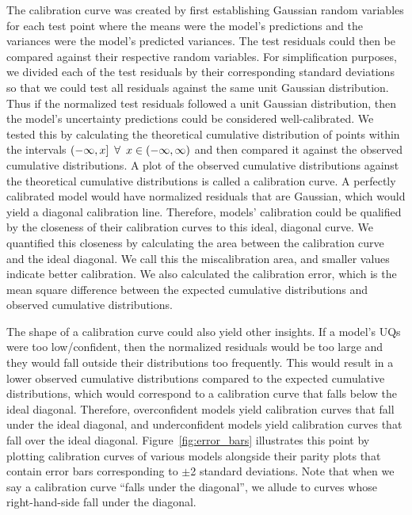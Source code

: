 \documentclass[]{achemso}
\begin{document}
The calibration curve was created by first establishing Gaussian random variables for each test point where the means were the model's predictions and the variances were the model's predicted variances.
The test residuals could then be compared against their respective random variables.
For simplification purposes, we divided each of the test residuals by their corresponding standard deviations so that we could test all residuals against the same unit Gaussian distribution.
Thus if the normalized test residuals followed a unit Gaussian distribution, then the model's uncertainty predictions could be considered well-calibrated.
We tested this by calculating the theoretical cumulative distribution of points within the intervals $(-\infty, x] \mkern9mu \forall \mkern9mu x \in (-\infty, \infty)$ and then compared it against the observed cumulative distributions.  %
A plot of the observed cumulative distributions against the theoretical cumulative distributions is called a calibration curve.
A perfectly calibrated model would have normalized residuals that are Gaussian, which would yield a diagonal calibration line.
Therefore, models' calibration could be qualified by the closeness of their calibration curves to this ideal, diagonal curve.
We quantified this closeness by calculating the area between the calibration curve and the ideal diagonal.
We call this the miscalibration area, and smaller values indicate better calibration.
We also calculated the calibration error,\cite{Kuleshov2018} which is the mean square difference between the expected cumulative distributions and observed cumulative distributions.

The shape of a calibration curve could also yield other insights.
If a model's \gls{UQ}s were too low/confident, then the normalized residuals would be too large and they would fall outside their distributions too frequently.
This would result in a lower observed cumulative distributions compared to the expected cumulative distributions, which would correspond to a calibration curve that falls below the ideal diagonal.
Therefore, overconfident models yield calibration curves that fall under the ideal diagonal, and underconfident models yield calibration curves that fall over the ideal diagonal.
Figure~\ref{fig:error_bars} illustrates this point by plotting calibration curves of various models alongside their parity plots that contain error bars corresponding to $\pm$2 standard deviations.
Note that when we say a calibration curve ``falls under the diagonal'', we allude to curves whose right-hand-side fall under the diagonal.
\end{document}
